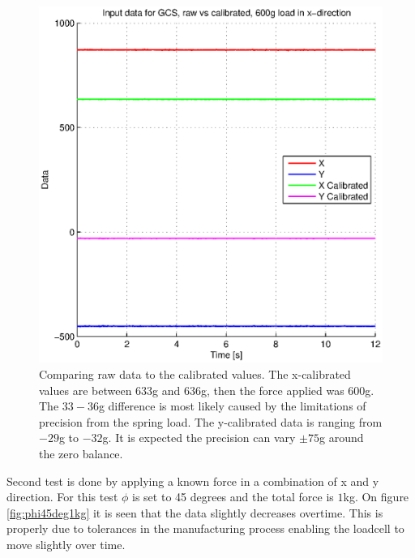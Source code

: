 \begin{figure}[H]
\centering
\includegraphics[scale=1]{graphics/gcs_test/calib_result_compare.eps}
\caption{Comparing raw data to the calibrated values. The x-calibrated values are between $633$g and $636$g, then the force applied was $600$g. The $33-36$g difference is most likely caused by the limitations of precision from the spring load. The y-calibrated data is ranging from $-29$g to $-32$g. It is expected the precision can vary $\pm75$g around the zero balance.}
\end{figure}

\noindent
Second test is done by applying a known force in a combination of x and y direction. For this test $\phi$ is set to 45 degrees and the total force is $1$kg. On figure \ref{fig:phi45deg1kg} it is seen that the data slightly decreases overtime. This is properly due to tolerances in the manufacturing process enabling the loadcell to move slightly over time.

